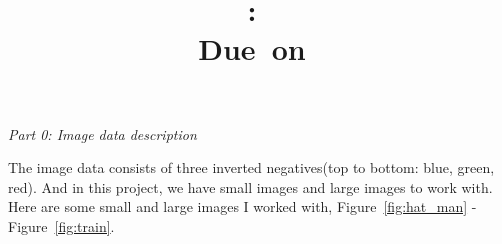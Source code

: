 \documentclass{article}
\title{
\vspace{2in}
\textmd{\textbf{\hmwkClass:\ \hmwkTitle}}\\
\normalsize\vspace{0.1in}\small{Due\ on\ \hmwkDueDate}\\
\vspace{0.1in}
\vspace{3in}
}
\author{\textbf{\hmwkAuthorName}}
\begin{document}
\maketitle
\clearpage


\begin{}

\noindent \textit{Part 0: Image data description}

The image data consists of three inverted negatives(top to bottom: blue, green, red). And in this project, we have small images and large images to work with. 
Here are some small and large images I worked with, Figure~\ref{fig:hat_man} - Figure~\ref{fig:train}.


\end{}
\end{document}
